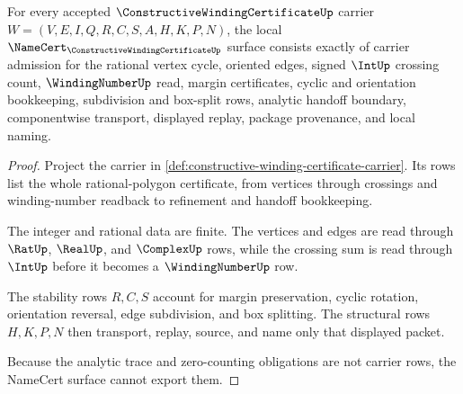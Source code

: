 \begin{theorem}
\label{thm:constructive-winding-certificate-namecert-obligations}
For every accepted $\ConstructiveWindingCertificateUp$ carrier $W=(V,E,I,Q,R,C,S,A,H,K,P,N)$, the local $\NameCert_{\ConstructiveWindingCertificateUp}$ surface consists exactly of carrier admission for the rational vertex cycle, oriented edges, signed $\IntUp$ crossing count, $\WindingNumberUp$ read, margin certificates, cyclic and orientation bookkeeping, subdivision and box-split rows, analytic handoff boundary, componentwise transport, displayed replay, package provenance, and local naming.
\end{theorem}
\begin{proof}
Project the carrier in \autoref{def:constructive-winding-certificate-carrier}. Its rows list the whole rational-polygon certificate, from vertices through crossings and winding-number readback to refinement and handoff bookkeeping.

The integer and rational data are finite. The vertices and edges are read through $\RatUp$, $\RealUp$, and $\ComplexUp$ rows, while the crossing sum is read through $\IntUp$ before it becomes a $\WindingNumberUp$ row.

The stability rows $R,C,S$ account for margin preservation, cyclic rotation, orientation reversal, edge subdivision, and box splitting. The structural rows $H,K,P,N$ then transport, replay, source, and name only that displayed packet.

Because the analytic trace and zero-counting obligations are not carrier rows, the NameCert surface cannot export them.
\end{proof}

